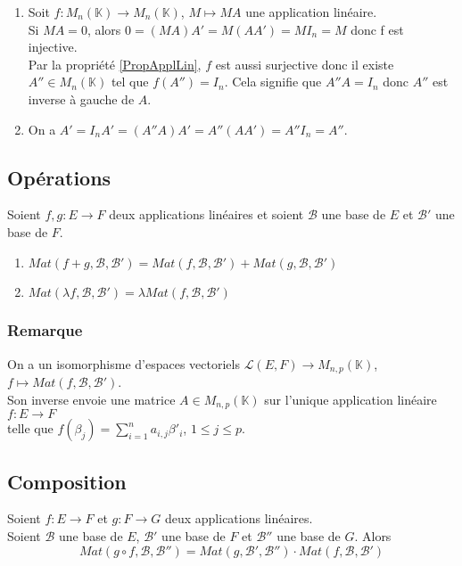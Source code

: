 \documentclass[a4paper,10pt]{book} %
\newcommand{\K}{\mathbb{K}}
\newcommand{\B}{\mathcal{B}}
\begin{document}
\begin{enumerate}
\item Soit $f:M_n(\K) \rightarrow M_n(\K)$, $M \mapsto MA$ une application linéaire.\\
Si $MA=0$, alors $0=(MA)A'=M(AA')=MI_n=M$ donc f est injective.\\

Par la propriété \ref{PropApplLin}, $f$ est aussi surjective donc il existe $A''\in M_n(\K)$ tel que $f(A'')=I_n$. Cela signifie que $A''A=I_n$ donc $A''$ est inverse à gauche de $A$.\\

\item On a $A'=I_nA'=(A''A)A'=A''(AA')=A''I_n=A''$.
\end{enumerate}

\subsection{Opérations}
Soient $f,g :E\rightarrow F$ deux applications linéaires et soient $\B$ une base de $E$ et $\B'$ une base de $F$.
\begin{enumerate}
\item $Mat(f+g,\B,\B')=Mat(f,\B,\B')+Mat(g,\B,\B')$
\item $Mat(\lambda f,\B,\B')=\lambda Mat(f,\B,\B')$
\end{enumerate}

\subsubsection{Remarque}
On a un isomorphisme d'espaces vectoriels $\mathcal{L}(E,F)\rightarrow M_{n,p}(\K)$, $f\mapsto Mat(f,\B,\B')$.\\

Son inverse envoie une matrice $A\in M_{n,p}(\K)$ sur l'unique application linéaire $f:E\rightarrow F$\\
telle que $f(\beta_j)=\displaystyle\sum\limits_{i=1}^na_{i,j}\beta'_i$, $1\leq j\leq p$.

\subsection{Composition}
Soient $f :E\rightarrow F$ et $g:F\rightarrow G$ deux applications linéaires.\\
Soient $\B$ une base de $E$, $\B'$ une base de $F$ et $\B''$ une base de $G$. Alors
$$Mat(g\circ f,\B,\B'')=Mat(g,\B',\B'')\cdot Mat(f,\B,\B')$$
\end{document}
